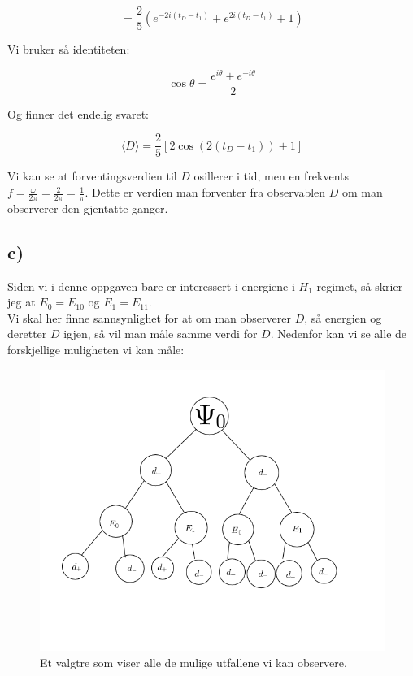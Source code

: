 \documentclass[a4paper,norsk, 10pt]{article}
\numberwithin{equation}{section}
\begin{document}
$$
= \frac{2}{5}\left(e^{-2i(t_D-t_1)} + e^{2i(t_D-t_1)} + 1\right)
$$

Vi bruker så identiteten:

$$
\cos \theta = \frac{e^{i\theta} + e^{-i\theta}}{2}
$$

Og finner det endelig svaret:

\begin{equation}
\langle D\rangle = \frac{2}{5}\left[2\cos(2(t_D - t_1)) + 1\right]
\label{eq:forventningD}
\end{equation}

Vi kan se at forventingsverdien til $D$ osillerer i tid, men en frekvents $f = \frac{\omega}{2\pi} = \frac{2}{2\pi} = \frac{1}{\pi}$. Dette er verdien man forventer fra observablen $D$ om man observerer den gjentatte ganger.

\subsection*{c)}

Siden vi i denne oppgaven bare er interessert i energiene i $H_1$-regimet, så skrier jeg at $E_0 = E_{10}$ og $E_1 = E_{11}$.\\

Vi skal her finne sannsynlighet for at om man observerer $D$, så energien og deretter $D$ igjen, så vil man måle samme verdi for $D$. Nedenfor kan vi se alle de forskjellige muligheten vi kan måle:

\begin{figure}[H]
\centering
\includegraphics[scale=0.6]{3c.png}
\caption{Et valgtre som viser alle de mulige utfallene vi kan observere.}
\end{figure}
\end{document}
